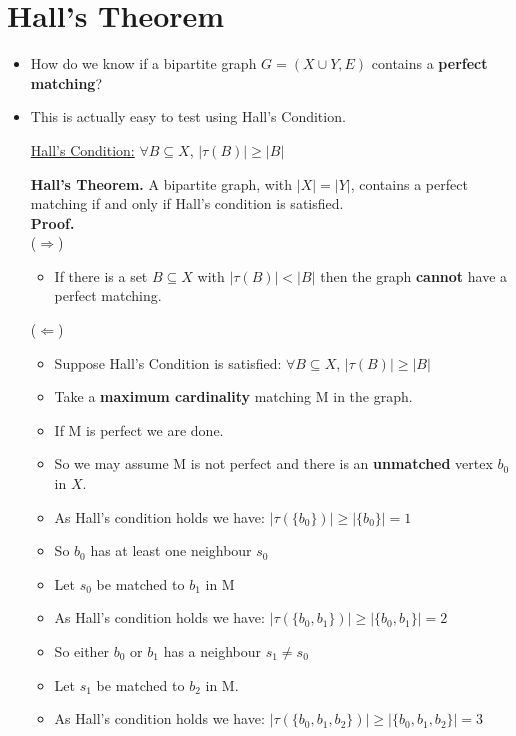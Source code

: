 \documentclass[12pt]{article}
\begin{document}
\section{Hall's Theorem}
\renewcommand{\labelitemii}{$\circ$}
\renewcommand{\labelitemiii}{$\cdot$}
\renewcommand{\labelitemiii}{$\rightarrow$}
\renewcommand{\labelitemiv}{$\star$}
\begin{itemize}
\item How do we know if a bipartite graph $G = (X \cup Y, E)$ contains a \textbf{perfect matching}?
\item This is actually easy to test using Hall's Condition.
\begin{center}
\underline{Hall's Condition:} $\forall B \subseteq X$, $|\tau(B)| \geq |B|$
\end{center}
\textbf{Hall's Theorem.}  A bipartite graph, with $|X| = |Y|$, contains a perfect matching if and only if Hall's condition is satisfied.\\
\textbf{Proof.}\\
($\Rightarrow$)
	\begin{itemize}
	\item If there is a set $B \subseteq X$ with $|\tau(B)| < |B|$ then the graph \textbf{cannot} have a perfect matching.
	\end{itemize}
($\Leftarrow$)
	\begin{itemize}
	\item Suppose Hall's Condition is satisfied: $\forall B \subseteq X$, $|\tau(B)| \geq |B|$
	\item Take a \textbf{maximum cardinality} matching M in the graph.
	\item If M is perfect we are done.
	\item So we may assume M is not perfect and there is an \textbf{unmatched} vertex $b_0$ in $X$.
	\item As Hall's condition holds we have: $|\tau(\{b_0\})| \geq |\{b_0\}| = 1$
	\item So $b_0$ has at least one neighbour $s_0$
	\item Let $s_0$ be matched to $b_1$ in M
	\item As Hall's condition holds we have: $|\tau(\{b_0, b_1\})| \geq |\{b_0, b_1\}| = 2$
	\item So either $b_0$ or $b_1$ has a neighbour $s_1 \neq s_0$
	\item Let $s_1$ be matched to $b_2$ in M.
	\item As Hall's condition holds we have: $|\tau(\{b_0, b_1, b_2\})| \geq |\{b_0, b_1, b_2\}| = 3$

\end{itemize}
\end{itemize}
\end{document}
